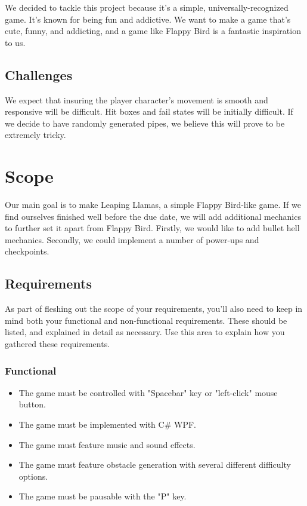 \documentclass[10pt,conference,onecolumn,compsoc]{IEEEtran}
\begin{document}
	We decided to tackle this project because it's a simple, universally-recognized game. It's known for being fun and addictive. We want to make a game that's cute, funny, and addicting, and a game like Flappy Bird is a fantastic inspiration to us.

\subsection{Challenges}
	We expect that insuring the player character's movement is smooth and responsive will be difficult. Hit boxes and fail states will be initially difficult. If we decide to have randomly generated pipes, we believe this will prove to be extremely tricky.

\section{Scope}
	Our main goal is to make Leaping Llamas, a simple Flappy Bird-like game. If we find ourselves finished well before the due date, we will add additional mechanics to further set it apart from Flappy Bird. Firstly, we would like to add bullet hell mechanics. Secondly, we could implement a number of power-ups and checkpoints.

\subsection{Requirements}
	As part of fleshing out the scope of your requirements, you'll also need to keep in mind both your functional and non-functional requirements.  These should be listed, and explained in detail as necessary.  Use this area to explain how you gathered these requirements.

\subsubsection{Functional}
	\begin{itemize}
	\item The game must be controlled with "Spacebar" key or "left-click" mouse button.
	\item The game must be implemented with C\# WPF.
	\item The game must feature music and sound effects.
	\item The game must feature obstacle generation with several different difficulty options.
	\item The game must be pausable with the "P" key.
	\end{itemize}
\end{document}
